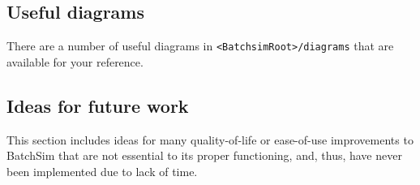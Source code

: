 \documentclass{article}
\newcommand{\BS}{<BatchsimRoot>}
\begin{document}
\subsection{Useful diagrams}

There are a number of useful diagrams in {\tt \BS/diagrams} that are available for your reference.

\subsection{Ideas for future work}
\label{misc:future-work}

This section includes ideas for many quality-of-life or ease-of-use improvements to BatchSim that are not essential to its proper functioning, and, thus, have never been implemented due to lack of time.
\end{document}
